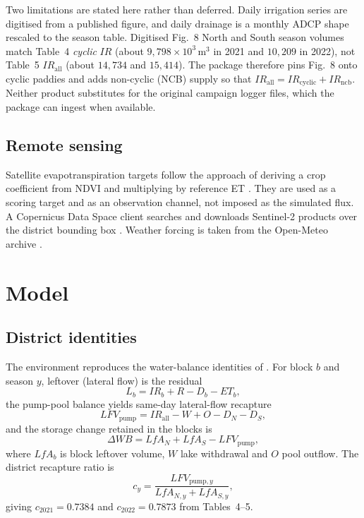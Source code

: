 \documentclass[preprint,12pt,authoryear,review]{elsarticle}
\begin{document}
Two limitations are stated here rather than deferred. Daily irrigation series are digitised from a published figure, and daily drainage is a monthly ADCP shape rescaled to the season table. Digitised Fig.~8 North and South season volumes match Table~4 \emph{cyclic} $IR$ (about $9{,}798 \times 10^3$\,m$^3$ in 2021 and $10{,}209$ in 2022), not Table~5 $IR_{\mathrm{all}}$ (about $14{,}734$ and $15{,}414$). The package therefore pins Fig.~8 onto cyclic paddies and adds non-cyclic (NCB) supply so that $IR_{\mathrm{all}} = IR_{\mathrm{cyclic}} + IR_{\mathrm{ncb}}$. Neither product substitutes for the original campaign logger files, which the package can ingest when available.

\subsection{Remote sensing}

Satellite evapotranspiration targets follow the approach of deriving a crop coefficient from NDVI and multiplying by reference ET \citep{allen1998,erraki2007}. They are used as a scoring target and as an observation channel, not imposed as the simulated flux. A Copernicus Data Space client searches and downloads Sentinel-2 products over the district bounding box \citep{drusch2012}. Weather forcing is taken from the Open-Meteo archive \citep{zippenfenig2023}.

\section{Model}
\label{sec:model}

\subsection{District identities}

The environment reproduces the water-balance identities of \citet{okura2025}. For block $b$ and season $y$, leftover (lateral flow) is the residual
\begin{equation}
L_b = IR_b + R - D_b - ET_b,
\label{eq:leftover}
\end{equation}
the pump-pool balance yields same-day lateral-flow recapture
\begin{equation}
LFV_{\mathrm{pump}} = IR_{\mathrm{all}} - W + O - D_N - D_S,
\label{eq:lfv}
\end{equation}
and the storage change retained in the blocks is
\begin{equation}
\Delta WB = LfA_N + LfA_S - LFV_{\mathrm{pump}},
\label{eq:dwb}
\end{equation}
where $LfA_b$ is block leftover volume, $W$ lake withdrawal and $O$ pool outflow. The district recapture ratio is
\begin{equation}
c_y = \frac{LFV_{\mathrm{pump},y}}{LfA_{N,y} + LfA_{S,y}},
\label{eq:cy}
\end{equation}
giving $c_{2021} = 0.7384$ and $c_{2022} = 0.7873$ from Tables~4--5.
\end{document}
